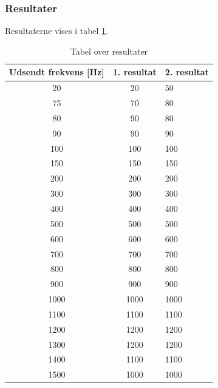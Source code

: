		\subsubsection{Resultater}
		Resultaterne vises i tabel \ref{usbhojresul}. 
		\begin{table}[]
				\centering
				\caption{Tabel over resultater}
				\label{usbhojresul}
				\begin{tabular}{lll}
					\multicolumn{1}{l|}{\textbf{Udsendt frekvens {[}Hz{]}}} & 	
					\multicolumn{1}{l|}{\textbf{1. resultat}} & \textbf{2. resultat} \\ \hline
					\multicolumn{1}{c|}{20}& 
					\multicolumn{1}{c|}{20}&50\\
					\multicolumn{1}{c|}{75}& 
					\multicolumn{1}{c|}{70}&80\\
					\multicolumn{1}{c|}{80}& 
					\multicolumn{1}{c|}{90}&80\\
					\multicolumn{1}{c|}{90}& 
					\multicolumn{1}{c|}{90}&90\\
					\multicolumn{1}{c|}{100}& 
					\multicolumn{1}{c|}{100}&100\\
					\multicolumn{1}{c|}{150}& 
					\multicolumn{1}{c|}{150}&150\\
					\multicolumn{1}{c|}{200}& 
					\multicolumn{1}{c|}{200}&200\\
					\multicolumn{1}{c|}{300}& 
					\multicolumn{1}{c|}{300}&300\\
					\multicolumn{1}{c|}{400}& 
					\multicolumn{1}{c|}{400}&400\\
					\multicolumn{1}{c|}{500}& 
					\multicolumn{1}{c|}{500}&500\\
					\multicolumn{1}{c|}{600}& 
					\multicolumn{1}{c|}{600}&600\\
					\multicolumn{1}{c|}{700}& 
					\multicolumn{1}{c|}{700}&700\\
					\multicolumn{1}{c|}{800}& 
					\multicolumn{1}{c|}{800}&800\\
					\multicolumn{1}{c|}{900}& 
					\multicolumn{1}{c|}{900}&900\\
					\multicolumn{1}{c|}{1000}& 
					\multicolumn{1}{c|}{1000}&1000\\
					\multicolumn{1}{c|}{1100}& 
					\multicolumn{1}{c|}{1100}&1100\\
					\multicolumn{1}{c|}{1200}& 
					\multicolumn{1}{c|}{1200}&1200\\
					\multicolumn{1}{c|}{1300}& 
					\multicolumn{1}{c|}{1200}&1200\\
					\multicolumn{1}{c|}{1400}& 
					\multicolumn{1}{c|}{1100}&1100\\
					\multicolumn{1}{c|}{1500}& 
					\multicolumn{1}{c|}{1000}&1000\\
                   \end{tabular}
			\end{table}
		
